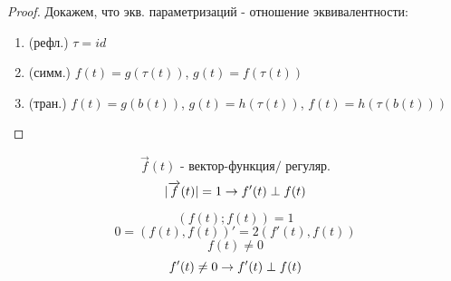 \documentclass[main, 12pt, fleqn]{subfiles}
\begin{document}
\begin{lect}
\begin{proof}
	Докажем, что экв. параметризаций - отношение эквивалентности:
    \begin{enumerate}
        \item (рефл.) $\tau=id$
        \item (симм.) $f(t)=g(\tau(t))$, $g(t)=f(\tau(t))$
        \item (тран.) $f(t)=g(b(t))$, $g(t)=h(\tau(t))$, $f(t)=h(\tau(b(t)))$
    \end{enumerate}
\end{proof}

\begin{Lemma}
	\[\overrightarrow{f}(t) \text{ - вектор-функция/ регуляр.}\]
	\[|\overrightarrow{f}(t)| = 1 \rightarrow f'(t) \perp f(t)\]
\end{Lemma}

\begin{Proof}
	\[(f(t); f(t)) = 1\]
	\[0 = (f(t), f(t))' = 2(f'(t), f(t))\]
	\[f(t) \neq 0\]
	\[f'(t) \neq 0 \rightarrow f'(t) \perp f(t)\]
\end{Proof}
\end{lect}
\end{document}
